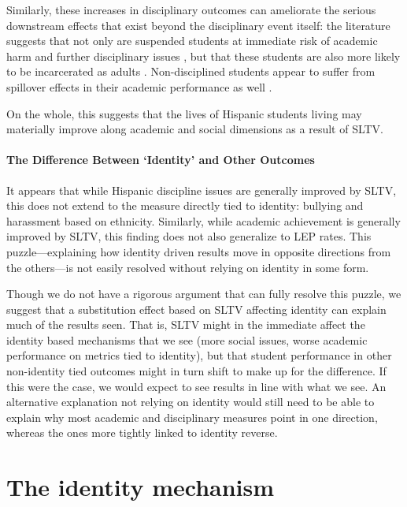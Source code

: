 \documentclass[11pt]{article}
\begin{document}
Similarly, these increases in disciplinary outcomes can ameliorate the serious downstream effects that exist beyond the disciplinary event itself: the literature suggests that not only are suspended students at immediate risk of academic harm and further disciplinary issues \citep{arcia_achievement_2006}, but that these students are also more likely to be incarcerated as adults  \citep{wolf_school_2017}. Non-disciplined students appear to suffer from spillover effects in their academic performance as well \citep{perry_suspending_2014}.



On the whole, this suggests that the lives of Hispanic students living may materially improve along academic and social dimensions as a result of SLTV. 

\paragraph{The Difference Between `Identity' and Other Outcomes}
It appears that while Hispanic discipline issues are generally improved by SLTV, this does not extend to the measure directly tied to identity: bullying and harassment based on ethnicity. Similarly, while academic achievement is generally improved by SLTV, this finding does not also generalize to LEP rates. This puzzle---explaining how identity driven results move in opposite directions from the others---is not easily resolved without relying on identity in some form. 

Though we do not have a rigorous argument that can fully resolve this puzzle, we suggest that a substitution effect based on SLTV affecting identity can explain much of the results seen. That is, SLTV might in the immediate affect the identity based mechanisms that we see (more social issues, worse academic performance on metrics tied to identity), but that student performance in other non-identity tied outcomes might in turn shift to make up for the difference. If this were the case, we would expect to see results in line with what we see. An alternative explanation not relying on identity would still need to be able to explain why most academic and disciplinary measures point in one direction, whereas the ones more tightly linked to identity reverse.



\section{The identity mechanism}\label{s:mech}
\end{document}
